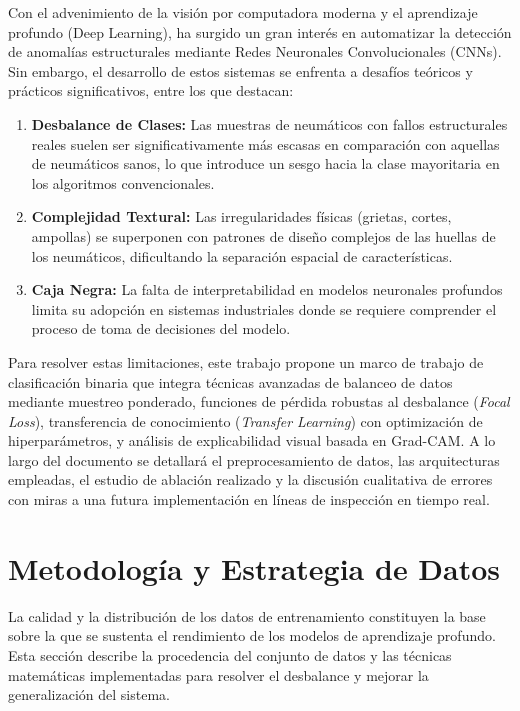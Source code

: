 \documentclass{article}
\begin{document}
Con el advenimiento de la visión por computadora moderna y el aprendizaje profundo (Deep Learning), ha surgido un gran interés en automatizar la detección de anomalías estructurales mediante Redes Neuronales Convolucionales (CNNs). Sin embargo, el desarrollo de estos sistemas se enfrenta a desafíos teóricos y prácticos significativos, entre los que destacan:
\begin{enumerate}
    \item \textbf{Desbalance de Clases:} Las muestras de neumáticos con fallos estructurales reales suelen ser significativamente más escasas en comparación con aquellas de neumáticos sanos, lo que introduce un sesgo hacia la clase mayoritaria en los algoritmos convencionales.
    \item \textbf{Complejidad Textural:} Las irregularidades físicas (grietas, cortes, ampollas) se superponen con patrones de diseño complejos de las huellas de los neumáticos, dificultando la separación espacial de características.
    \item \textbf{Caja Negra:} La falta de interpretabilidad en modelos neuronales profundos limita su adopción en sistemas industriales donde se requiere comprender el proceso de toma de decisiones del modelo.
\end{enumerate}

Para resolver estas limitaciones, este trabajo propone un marco de trabajo de clasificación binaria que integra técnicas avanzadas de balanceo de datos mediante muestreo ponderado, funciones de pérdida robustas al desbalance (\textit{Focal Loss}), transferencia de conocimiento (\textit{Transfer Learning}) con optimización de hiperparámetros, y análisis de explicabilidad visual basada en Grad-CAM. A lo largo del documento se detallará el preprocesamiento de datos, las arquitecturas empleadas, el estudio de ablación realizado y la discusión cualitativa de errores con miras a una futura implementación en líneas de inspección en tiempo real.

\section{Metodología y Estrategia de Datos}
La calidad y la distribución de los datos de entrenamiento constituyen la base sobre la que se sustenta el rendimiento de los modelos de aprendizaje profundo. Esta sección describe la procedencia del conjunto de datos y las técnicas matemáticas implementadas para resolver el desbalance y mejorar la generalización del sistema.
\end{document}
